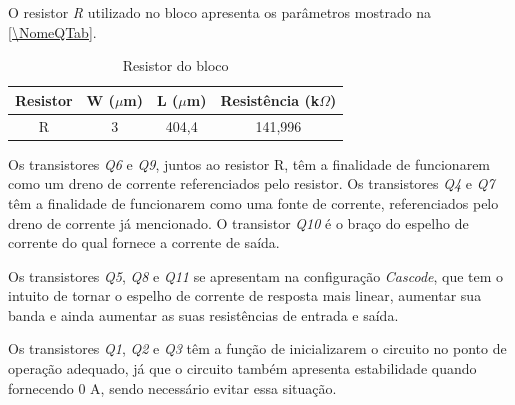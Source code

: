 O resistor \emph{R} utilizado no bloco apresenta os par\^ametros mostrado na \autoref{\NomeQTab}.

\begin{table}[!h]
\caption{Resistor do bloco \NomeBloco}
\label{\NomeQTab}
\centering
\begin{tabular}{cccc}
\toprule
Resistor & W ($\mu$m)  & L ($\mu$m) & Resist\^encia (k$\Omega$)\\
\midrule \midrule
R & 3 & 404,4 & 141,996\\
\bottomrule
\end{tabular}
\end{table}

Os transistores \emph{Q6} e \emph{Q9}, juntos ao resistor R, t\^em a finalidade de funcionarem como um dreno de corrente referenciados pelo resistor. Os transistores \emph{Q4} e \emph{Q7} t\^em a finalidade de funcionarem como uma fonte de corrente, referenciados pelo dreno de corrente j\'a mencionado. O transistor \emph{Q10} \'e o braço do espelho de corrente do qual fornece a corrente de sa\'ida.

Os transistores \emph{Q5}, \emph{Q8} e \emph{Q11} se apresentam na configuração \emph{Cascode}, que tem o intuito de tornar o espelho de corrente de resposta mais linear, aumentar sua banda e ainda aumentar as suas resist\^encias de entrada e sa\'ida.

Os transistores \emph{Q1}, \emph{Q2} e \emph{Q3} t\^em a função de inicializarem o circuito no ponto de operação adequado, j\'a que o circuito tamb\'em apresenta estabilidade quando fornecendo 0 A, sendo necess\'ario evitar essa situação.
